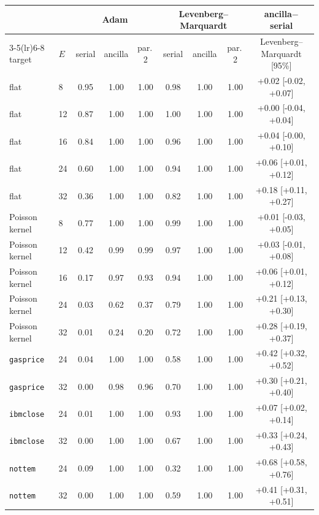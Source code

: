 \begin{tabular}{llccccccc}\toprule
 & & \multicolumn{3}{c}{Adam} & \multicolumn{3}{c}{Levenberg--Marquardt} & ancilla$-$serial \\
\cmidrule(lr){3-5}\cmidrule(lr){6-8}
target & $E$ & serial & ancilla & par.\,2 & serial & ancilla & par.\,2 & Levenberg--Marquardt [95\%] \\\midrule
flat & 8 & 0.95 & 1.00 & 1.00 & 0.98 & 1.00 & 1.00 & +0.02 [-0.02, +0.07] \\
flat & 12 & 0.87 & 1.00 & 1.00 & 1.00 & 1.00 & 1.00 & +0.00 [-0.04, +0.04] \\
flat & 16 & 0.84 & 1.00 & 1.00 & 0.96 & 1.00 & 1.00 & +0.04 [-0.00, +0.10] \\
flat & 24 & 0.60 & 1.00 & 1.00 & 0.94 & 1.00 & 1.00 & +0.06 [+0.01, +0.12] \\
flat & 32 & 0.36 & 1.00 & 1.00 & 0.82 & 1.00 & 1.00 & +0.18 [+0.11, +0.27] \\
\midrule
Poisson kernel & 8 & 0.77 & 1.00 & 1.00 & 0.99 & 1.00 & 1.00 & +0.01 [-0.03, +0.05] \\
Poisson kernel & 12 & 0.42 & 0.99 & 0.99 & 0.97 & 1.00 & 1.00 & +0.03 [-0.01, +0.08] \\
Poisson kernel & 16 & 0.17 & 0.97 & 0.93 & 0.94 & 1.00 & 1.00 & +0.06 [+0.01, +0.12] \\
Poisson kernel & 24 & 0.03 & 0.62 & 0.37 & 0.79 & 1.00 & 1.00 & +0.21 [+0.13, +0.30] \\
Poisson kernel & 32 & 0.01 & 0.24 & 0.20 & 0.72 & 1.00 & 1.00 & +0.28 [+0.19, +0.37] \\
\midrule
\texttt{gasprice} & 24 & 0.04 & 1.00 & 1.00 & 0.58 & 1.00 & 1.00 & +0.42 [+0.32, +0.52] \\
\texttt{gasprice} & 32 & 0.00 & 0.98 & 0.96 & 0.70 & 1.00 & 1.00 & +0.30 [+0.21, +0.40] \\
\midrule
\texttt{ibmclose} & 24 & 0.01 & 1.00 & 1.00 & 0.93 & 1.00 & 1.00 & +0.07 [+0.02, +0.14] \\
\texttt{ibmclose} & 32 & 0.00 & 1.00 & 1.00 & 0.67 & 1.00 & 1.00 & +0.33 [+0.24, +0.43] \\
\midrule
\texttt{nottem} & 24 & 0.09 & 1.00 & 1.00 & 0.32 & 1.00 & 1.00 & +0.68 [+0.58, +0.76] \\
\texttt{nottem} & 32 & 0.00 & 1.00 & 1.00 & 0.59 & 1.00 & 1.00 & +0.41 [+0.31, +0.51] \\
\bottomrule
\end{tabular}
